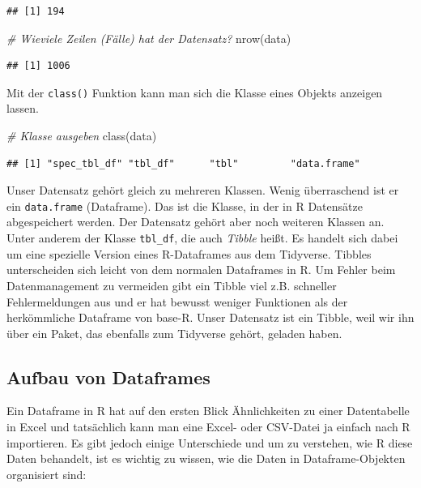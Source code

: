 \documentclass[
]{book}
\newenvironment{Shaded}{\begin{snugshade}}{\end{snugshade}}
\newcommand{\CommentTok}[1]{\textcolor[rgb]{0.56,0.35,0.01}{\textit{#1}}}
\newcommand{\FunctionTok}[1]{\textcolor[rgb]{0.00,0.00,0.00}{#1}}
\newcommand{\NormalTok}[1]{#1}
\begin{document}
\begin{verbatim}
## [1] 194
\end{verbatim}

\begin{Shaded}
\begin{Highlighting}[]
\CommentTok{\# Wieviele Zeilen (Fälle) hat der Datensatz?}
\FunctionTok{nrow}\NormalTok{(data)}
\end{Highlighting}
\end{Shaded}

\begin{verbatim}
## [1] 1006
\end{verbatim}

Mit der \texttt{class()} Funktion kann man sich die Klasse eines Objekts anzeigen lassen.

\begin{Shaded}
\begin{Highlighting}[]
\CommentTok{\# Klasse ausgeben}
\FunctionTok{class}\NormalTok{(data)}
\end{Highlighting}
\end{Shaded}

\begin{verbatim}
## [1] "spec_tbl_df" "tbl_df"      "tbl"         "data.frame"
\end{verbatim}

Unser Datensatz gehört gleich zu mehreren Klassen. Wenig überraschend ist er ein \texttt{data.frame} (Dataframe). Das ist die Klasse, in der in R Datensätze abgespeichert werden. Der Datensatz gehört aber noch weiteren Klassen an. Unter anderem der Klasse \texttt{tbl\_df}, die auch \emph{Tibble} heißt. Es handelt sich dabei um eine spezielle Version eines R-Dataframes aus dem Tidyverse. Tibbles unterscheiden sich leicht von dem normalen Dataframes in R. Um Fehler beim Datenmanagement zu vermeiden gibt ein Tibble viel z.B. schneller Fehlermeldungen aus und er hat bewusst weniger Funktionen als der herkömmliche Dataframe von base-R. Unser Datensatz ist ein Tibble, weil wir ihn über ein Paket, das ebenfalls zum Tidyverse gehört, geladen haben.

\hypertarget{aufbau-von-dataframes}{%
\subsection{Aufbau von Dataframes}\label{aufbau-von-dataframes}}

Ein Dataframe in R hat auf den ersten Blick Ähnlichkeiten zu einer Datentabelle in Excel und tatsächlich kann man eine Excel- oder CSV-Datei ja einfach nach R importieren. Es gibt jedoch einige Unterschiede und um zu verstehen, wie R diese Daten behandelt, ist es wichtig zu wissen, wie die Daten in Dataframe-Objekten organisiert sind:
\end{document}
